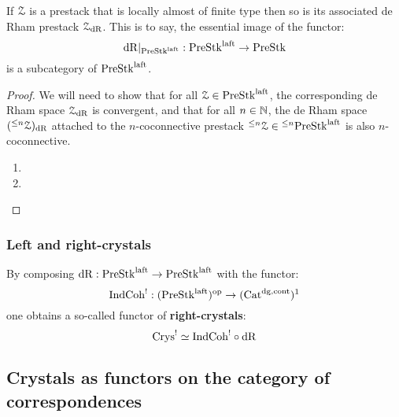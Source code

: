                 \begin{proposition} \label{prop: laft_de_rham_spaces}
                    If $\mathcal{Z}$ is a prestack that is locally almost of finite type then so is its associated de Rham prestack $\mathcal{Z}_{\mathrm{dR}}$. This is to say, the essential image of the functor:
                        $$\mathrm{dR}|_{\mathrm{Pre}\mathrm{Stk}^{\mathrm{laft}}}: \mathrm{Pre}\mathrm{Stk}^{\mathrm{laft}} \to \mathrm{Pre}\mathrm{Stk}$$
                    is a subcategory of $\mathrm{Pre}\mathrm{Stk}^{\mathrm{laft}}$.
                \end{proposition}
                    \begin{proof}
                        We will need to show that for all $\mathcal{Z} \in \mathrm{Pre}\mathrm{Stk}^{\mathrm{laft}}$, the corresponding de Rham space $\mathcal{Z}_{\mathrm{dR}}$ is convergent, and that for all $n \in \mathbb{N}$, the de Rham space $({}^{\leq n}\mathcal{Z})_{\mathrm{dR}}$ attached to the $n$-coconnective prestack ${}^{\leq n}\mathcal{Z} \in {}^{\leq n}\mathrm{Pre}\mathrm{Stk}^{\mathrm{laft}}$ is also $n$-coconnective.
                            \begin{enumerate}
                                \item 
                                \item 
                            \end{enumerate}
                    \end{proof}
                
                \begin{remark} \label{remark: universal_property_of_de_rham_spaces}
                    
                \end{remark}
                    
            \subsubsection{Left and right-crystals}
                \begin{definition} \label{def: right-crystals}
                    By composing $\mathrm{dR}: \mathrm{Pre}\mathrm{Stk}^{\mathrm{laft}} \to \mathrm{Pre}\mathrm{Stk}^{\mathrm{laft}}$ with the functor:
                        $$\mathrm{Ind}\mathrm{Coh}^!: (\mathrm{Pre}\mathrm{Stk}^{\mathrm{laft}})^{\mathrm{op}} \to (\mathrm{Cat}^{\mathrm{dg}, \mathrm{cont}})^1$$
                    one obtains a so-called functor of \textbf{right-crystals}:
                        $$\mathrm{Crys}^! \simeq \mathrm{Ind}\mathrm{Coh}^! \circ \mathrm{dR}$$
                \end{definition}
        
        \subsection{Crystals as functors on the category of correspondences}
        
